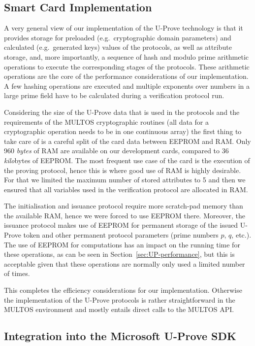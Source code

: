 \subsection{Smart Card Implementation}

A very general view of our implementation of the U-Prove technology is that it
provides storage for preloaded (e.g.\ cryptographic domain parameters) and
calculated (e.g.\ generated keys) values of the protocols, as well as attribute
storage, and, more importantly, a sequence of hash and modulo prime arithmetic
operations to execute the corresponding stages of the protocols. These
arithmetic operations are the core of the performance considerations of our
implementation. A few hashing operations are executed and multiple exponents
over numbers in a large prime field have to be calculated during a verification
protocol run.

Considering the size of the U-Prove data that is used in the protocols and the
requirements of the MULTOS cryptographic routines (all data for a cryptographic
operation needs to be in one continuous array) the first thing to take care of
is a careful split of the card data between EEPROM and RAM. Only 960
\emph{bytes} of RAM are available on our development cards, compared to
36 \emph{kilo}bytes of EEPROM. The most frequent use case of the card is the
execution of the proving protocol, hence this is where good use of RAM is highly
desirable. For that we limited the maximum number of stored attributes to 5 and
then we ensured that all variables used in the verification protocol are
allocated in RAM.

The initialisation and issuance protocol require more scratch-pad memory than
the available RAM, hence we were forced to use EEPROM there. Moreover, the
issuance protocol makes use of EEPROM for permanent storage of the issued
U-Prove token and other permanent protocol parameters (prime numbers $p$, $q$,
etc.). The use of EEPROM for computations has an impact on the running time for
these operations, as can be seen in Section~\ref{sec:UP-performance}, but this
is acceptable given that these operations are normally only used a limited
number of times.

This completes the efficiency considerations for our implementation. Otherwise
the implementation of the U-Prove protocols is rather straightforward in the
MULTOS environment and mostly entails direct calls to the MULTOS API.

\subsection{Integration into the Microsoft U-Prove SDK}

